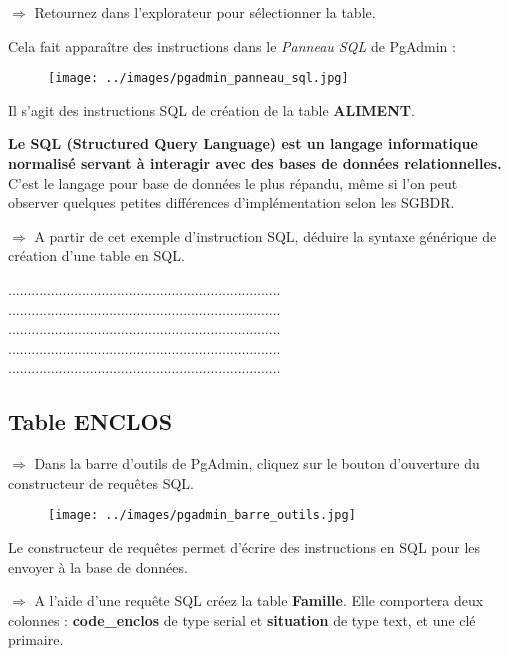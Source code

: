 \documentclass[11pt]{article}
\begin{document}
			$\Rightarrow$ Retournez dans l'explorateur pour sélectionner la table.
			
			Cela fait apparaître des instructions dans le \textit{Panneau SQL} de PgAdmin :
			\begin{figure}[H]
				\center \texttt{[image: ../images/pgadmin\_panneau\_sql.jpg]}\\[1em]
			\end{figure}
			
			Il s'agit des instructions SQL de création de la table \textbf{ALIMENT}.
			
			\textbf{Le SQL (Structured Query Language) est un langage informatique normalisé servant à interagir avec des bases de données relationnelles.} C'est le langage pour base de données le plus répandu, même si l'on peut observer quelques petites différences d'implémentation selon les SGBDR.
			
			$\Rightarrow$ A partir de cet exemple d'instruction SQL, déduire la syntaxe générique de création d'une table en SQL.
			
			......................................................................\\
			......................................................................\\
			......................................................................\\
			......................................................................\\
			......................................................................\\
			
			\subsection{Table ENCLOS}
				$\Rightarrow$ Dans la barre d'outils de PgAdmin, cliquez sur le bouton d'ouverture du constructeur de requêtes SQL.
				\begin{figure}[H]
					\center \texttt{[image: ../images/pgadmin\_barre\_outils.jpg]}\\[1em]
				\end{figure}
				 
				Le constructeur de requêtes permet d'écrire des instructions en SQL pour les envoyer à la base de données.
				
				$\Rightarrow$ A l'aide d'une requête SQL créez la table \textbf{Famille}. Elle comportera deux colonnes : \textbf{code\_enclos} de type serial et \textbf{situation} de type text, et une clé primaire.
\end{document}
